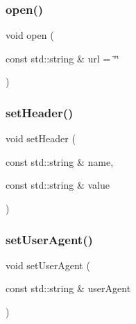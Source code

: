 \mbox{\label{classiurlstream_a9759fd1c1bf1427fa02340c2dabd47d6}} 
\subsubsection{\texorpdfstring{open()}{open()}}
{\footnotesize\ttfamily void open (\begin{DoxyParamCaption}\item[{const std\+::string \&}]{url = {\ttfamily \char`\"{}\char`\"{}} }\end{DoxyParamCaption})}

\mbox{\label{classiurlstream_af7065da3945b84ffb547b8bad9ddf8dc}} 
\subsubsection{\texorpdfstring{set\+Header()}{setHeader()}}
{\footnotesize\ttfamily void set\+Header (\begin{DoxyParamCaption}\item[{const std\+::string \&}]{name,  }\item[{const std\+::string \&}]{value }\end{DoxyParamCaption})}

\mbox{\label{classiurlstream_a766286050e9b8fe08919f8353ecb4031}} 
\subsubsection{\texorpdfstring{set\+User\+Agent()}{setUserAgent()}}
{\footnotesize\ttfamily void set\+User\+Agent (\begin{DoxyParamCaption}\item[{const std\+::string \&}]{user\+Agent }\end{DoxyParamCaption})}

